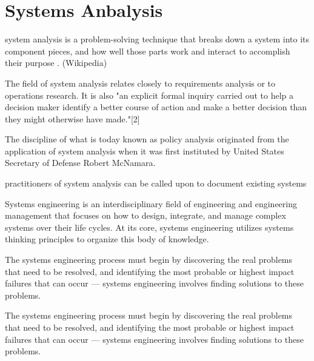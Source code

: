 \documentclass[letterpaper,12pt,titlepage,oneside,final]{book}
\begin{document}

\section{Systems Anbalysis}
 
 system analysis is a problem-solving technique that breaks down a system into its component pieces, and how well those parts work and interact to accomplish their purpose . (Wikipedia)

The field of system analysis relates closely to requirements analysis or to operations research. It is also "an explicit formal inquiry carried out to help a decision maker identify a better course of action and make a better decision than they might otherwise have made."[2] 

The discipline of what is today known as policy analysis originated from the application of system analysis when it was first instituted by United States Secretary of Defense Robert McNamara.

practitioners of system analysis can be called upon to document existing systems 

Systems engineering is an interdisciplinary field of engineering and engineering management that focuses on how to design, integrate, and manage complex systems over their life cycles. At its core, systems engineering utilizes systems thinking principles to organize this body of knowledge. 

The systems engineering process must begin by discovering the real problems that need to be resolved, and identifying the most probable or highest impact failures that can occur — systems engineering involves finding solutions to these problems. 

The systems engineering process must begin by discovering the real problems that need to be resolved, and identifying the most probable or highest impact failures that can occur — systems engineering involves finding solutions to these problems. 
\end{document}
